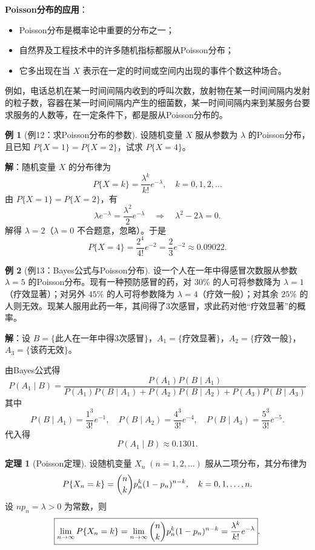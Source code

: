 \documentclass[11pt,a4paper]{report}
\theoremstyle{definition}
\newtheorem{example}{例}[chapter]
\newtheorem{theorem}{定理}[chapter]
\begin{document}
\textbf{Poisson分布的应用}：
\begin{itemize}[leftmargin=2em]
    \item Poisson分布是概率论中重要的分布之一；
    \item 自然界及工程技术中的许多随机指标都服从Poisson分布；
    \item 它多出现在当 $X$ 表示在一定的时间或空间内出现的事件个数这种场合。
\end{itemize}

例如，电话总机在某一时间间隔内收到的呼叫次数，放射物在某一时间间隔内发射的粒子数，容器在某一时间间隔内产生的细菌数，某一时间间隔内来到某服务台要求服务的人数等，在一定条件下，都是服从Poisson分布的。

\begin{example}[例12：求Poisson分布的参数]
设随机变量 $X$ 服从参数为 $\lambda$ 的Poisson分布，且已知 $P\{X=1\}=P\{X=2\}$，试求 $P\{X=4\}$。
\end{example}

\textbf{解}：随机变量 $X$ 的分布律为
\[
P\{X=k\} = \frac{\lambda^k}{k!}e^{-\lambda}, \quad k=0,1,2,\dots
\]
由 $P\{X=1\}=P\{X=2\}$，有
\[
\lambda e^{-\lambda} = \frac{\lambda^2}{2}e^{-\lambda} \quad\Longrightarrow\quad \lambda^2 - 2\lambda = 0.
\]
解得 $\lambda=2$（$\lambda=0$ 不合题意，忽略）。于是
\[
\boxed{P\{X=4\} = \frac{2^4}{4!}e^{-2} = \frac{2}{3}e^{-2} \approx 0.09022}.
\]

\begin{example}[例13：Bayes公式与Poisson分布]
设一个人在一年中得感冒次数服从参数 $\lambda=5$ 的Poisson分布。现有一种预防感冒的药，对 $30\%$ 的人可将参数降为 $\lambda=1$（疗效显著）；对另外 $45\%$ 的人可将参数降为 $\lambda=4$（疗效一般）；对其余 $25\%$ 的人则无效。现某人服用此药一年，其间得了3次感冒，求此药对他``疗效显著''的概率。
\end{example}

\textbf{解}：设 $B=\{\text{此人在一年中得3次感冒}\}$，$A_1=\{\text{疗效显著}\}$，$A_2=\{\text{疗效一般}\}$，$A_3=\{\text{该药无效}\}$。

由Bayes公式得
\[
P(A_1 \mid B) = \frac{P(A_1)P(B \mid A_1)}{P(A_1)P(B \mid A_1)+P(A_2)P(B \mid A_2)+P(A_3)P(B \mid A_3)}
\]
其中
\[
P(B \mid A_1) = \frac{1^3}{3!}e^{-1}, \quad P(B \mid A_2) = \frac{4^3}{3!}e^{-4}, \quad P(B \mid A_3) = \frac{5^3}{3!}e^{-5}.
\]
代入得
\[
\boxed{P(A_1 \mid B) \approx 0.1301}.
\]

\begin{theorem}[Poisson定理]
设随机变量 $X_n\;(n=1,2,\dots)$ 服从二项分布，其分布律为
\[
P\{X_n=k\} = \dbinom{n}{k}p_n^k(1-p_n)^{n-k}, \quad k=0,1,\dots,n.
\]
设 $np_n = \lambda > 0$ 为常数，则
\[
\boxed{\lim_{n\to\infty} P\{X_n=k\} = \lim_{n\to\infty}\dbinom{n}{k}p_n^k(1-p_n)^{n-k} = \frac{\lambda^k}{k!}e^{-\lambda}}.
\]
\end{theorem}
\end{document}
